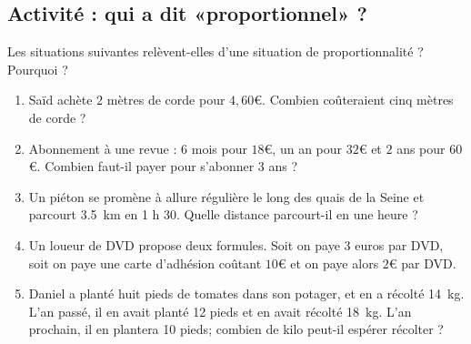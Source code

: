 
\subsection*{Activité : qui a dit «proportionnel» ?}

Les situations suivantes relèvent-elles d’une situation de proportionnalité ? Pourquoi ?
\begin{enumerate}
    \item

 Saïd achète $2$ mètres de corde pour $4,60$€. Combien coûteraient cinq mètres de corde ?


\item
 Abonnement à une revue : \( 6\) mois pour \( 18\)€, un an pour \( 32\)€ et \( 2\) ans pour \( 60\)€. Combien faut-il payer pour s'abonner \( 3\) ans ?
\item
    Un piéton se promène à allure régulière le long des quais de la Seine et parcourt \SI{3.5}{\kilo\meter} en 1 h 30. Quelle distance parcourt-il en une heure ?
\item

 Un loueur de DVD propose deux formules. Soit on paye \( 3\) euros par DVD, soit on paye une carte d'adhésion coûtant $10$€ et on paye alors $2$€ par DVD.

\item
    Daniel a planté huit pieds de tomates dans son potager, et en a récolté \SI{14}{\kilo\gram}. L'an passé, il en avait planté 12 pieds et en avait récolté \SI{18}{\kilo\gram}. L'an prochain, il en plantera 10 pieds; combien de kilo peut-il espérer récolter ?
\end{enumerate}
